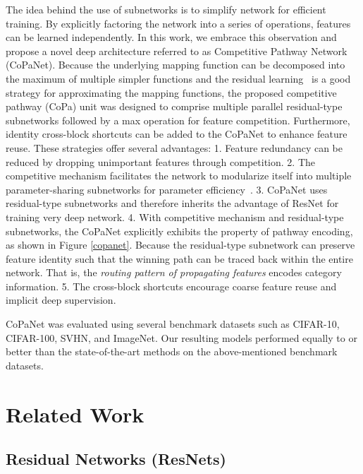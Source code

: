 \documentclass[wcp]{jmlr}
\begin{document}
The idea behind the use of subnetworks is to simplify network for efficient training.
By explicitly factoring the network into a series of operations, features can be learned independently.
In this work, we embrace this observation and propose a novel deep architecture referred to as Competitive Pathway Network (CoPaNet).
Because the underlying mapping function can be decomposed into the maximum of multiple simpler functions and the residual learning~\citep{he2015deep} is a good strategy for approximating the mapping functions, the proposed competitive pathway (CoPa) unit was designed to comprise multiple parallel residual-type subnetworks followed by a max operation for feature competition.
Furthermore, identity cross-block shortcuts can be added to the CoPaNet to enhance feature reuse.
These strategies offer several advantages: 
1. Feature redundancy can be reduced by dropping unimportant features through competition.
2. The competitive mechanism facilitates the network to modularize itself into multiple parameter-sharing subnetworks for parameter efficiency~\citep{srivastava2013compete}.
3. CoPaNet uses residual-type subnetworks and therefore inherits the advantage of ResNet for training very deep network.
4. With competitive mechanism and residual-type subnetworks, the CoPaNet explicitly exhibits the property of pathway encoding, as shown in Figure \ref{copanet}. Because the residual-type subnetwork can preserve feature identity such that the winning path can be traced back within the entire network.
That is, the \textit{routing pattern of propagating features} encodes category information.
5. The cross-block shortcuts encourage coarse feature reuse and implicit deep supervision.





CoPaNet was evaluated using several benchmark datasets such as CIFAR-10, CIFAR-100, SVHN, and ImageNet. 
Our resulting models performed equally to or better than the state-of-the-art methods on the above-mentioned benchmark datasets.






\section{Related Work}



\subsection{Residual Networks (ResNets)}
\end{document}

